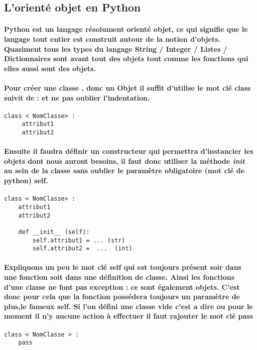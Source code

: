 \documentclass[a4paper, 12pt, twoside]{article}
\begin{document}
\subsection{L'orienté objet en Python}
\paragraph{ Python est un langage résolument orienté objet, ce qui signifie que le langage tout entier est construit autour de la notion d’objets. Quasiment tous les types du langage String / Integer / Listes / Dictionnaires  sont avant tout des objets tout comme les fonctions
qui elles aussi sont des objets.}

\paragraph{ Pour créer une classe , donc un Objet il suffit d'utilise le mot clé class suivit de  :  et ne pas oublier l'indentation.}
\begin{verbatim}
class < NomClasse> : 
     attribut1
     attribut2 
\end{verbatim}

\paragraph{Ensuite il faudra définir un constructeur qui permettra d'instancier les objets dont nous auront besoins, il faut donc utiliser la méthode  \textit{init} au sein de la classe sans oublier le paramètre obligatoire (mot clé de python) self. }

\begin{verbatim}
class < NomClasse> : 
    attribut1
    attribut2 

    def __init__ (self):
        self.attribut1 = ... (str)
        self.attribut2 =  ...  (int)
\end{verbatim}
\paragraph{Expliquons un peu le mot clé self qui est toujours présent soir dans une fonction soit dans une définition de classe. Ainsi les fonctions d’une classe ne font pas exception : ce sont également objets. C'est donc pour cela que la fonction possédera toujours un paramètre de plus,le fameux self.  Si l'on défini une classe vide c'est a dire ou pour le moment il n'y aucune action à effectuer il faut rajouter le mot clé pass}
\begin{verbatim}
class < NomClasse > : 
    pass 
\end{verbatim}
\end{document}

